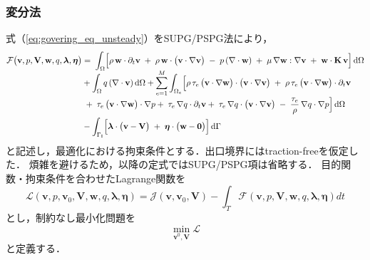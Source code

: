 \subsubsection{変分法}
式（\ref{eq:govering_eq_unsteady}）をSUPG/PSPG法により，
\begin{equation}
    \label{eq:weak_form_unsteady}
    \begin{aligned}
        \mathcal{F}\bigl(\mathbf{v}, p, \mathbf{V}, \mathbf{w}, q, \bm{\lambda}, \bm{\eta}\bigr)
        & =\;
        \int_{\Omega} \Bigl[
            \rho\, \mathbf{w} \cdot \partial_t \mathbf{v}
            \;+\; \rho\, \mathbf{w} \cdot \bigl(\mathbf{v} \cdot \nabla \mathbf{v}\bigr)
            \;-\; p\, (\nabla \cdot \mathbf{w})
            \;+\; \mu\, \nabla \mathbf{w} : \nabla \mathbf{v}
            \;+\; \mathbf{w} \cdot \mathbf{K}\, \mathbf{v}
        \Bigr] \,\mathrm{d}\Omega \\
        &
        + \int_{\Omega} 
            q\, (\nabla \cdot \mathbf{v})
        \,\mathrm{d}\Omega
        + \smash{\sum_{e=1}^{M}}
        \int_{\Omega_{e}} \Bigl[
            \rho\, \tau_{e}\,
              \bigl(\mathbf{v} \cdot \nabla \mathbf{w}\bigr)
              \cdot
              \bigl(\mathbf{v} \cdot \nabla \mathbf{v}\bigr)
            \;+\;
              \rho\, \tau_{e}\,
              \bigl(\mathbf{v} \cdot \nabla \mathbf{w}\bigr)
              \cdot
              \partial_t \mathbf{v} \\
            & \;+\;
            \tau_{e}\,
              \bigl(\mathbf{v} \cdot \nabla \mathbf{w}\bigr)
              \cdot
              \nabla p 
            +\;
            \tau_{e}\,
            \nabla q \cdot 
            \partial_t \mathbf{v}
            +\;
            \tau_{e}\,
            \nabla q \cdot 
            \bigl(\mathbf{v} \cdot \nabla \mathbf{v}\bigr)
            \;-\;
            \frac{\tau_{e}}{\rho}\,
            \nabla q \cdot
            \nabla p
        \Bigr]\,\mathrm{d}\Omega \\
        &
        - \int_{\Gamma_{\mathrm{I}}} \Bigl[
            \bm{\lambda} \cdot \bigl(\mathbf{v} - \mathbf{V}\bigr)
            \;+\;
            \bm{\eta} \cdot \bigl(\mathbf{w} - \mathbf{0}\bigr)
        \Bigr]\,\mathrm{d}\Gamma
    \end{aligned} 
\end{equation} 
と記述し，最適化における拘束条件とする．出口境界にはtraction-freeを仮定した．
煩雑を避けるため，以降の定式ではSUPG/PSPG項は省略する．
目的関数・拘束条件を合わせたLagrange関数を
\begin{equation}
    \label{eq:lagrange_unsteady}
    \mathcal{L}\left(\mathbf{v}, p, \mathbf{v}_{0}, \mathbf{V}, \mathbf{w}, q, \bm{\lambda}, \bm{\eta}\right)
    =\mathcal{J}\left(\mathbf{v}, \mathbf{v}_{0}, \mathbf{V}\right) - \int_{T}\mathcal{F}\left(\mathbf{v}, p, \mathbf{V}, \mathbf{w}, q, \bm{\lambda}, \bm{\eta}\right)dt
\end{equation}
とし，制約なし最小化問題を
\begin{equation}
    \label{eq:minimization}
    \min_{\mathbf{v}^{0}, \mathbf{V}} \mathcal{L}
\end{equation}
と定義する．


